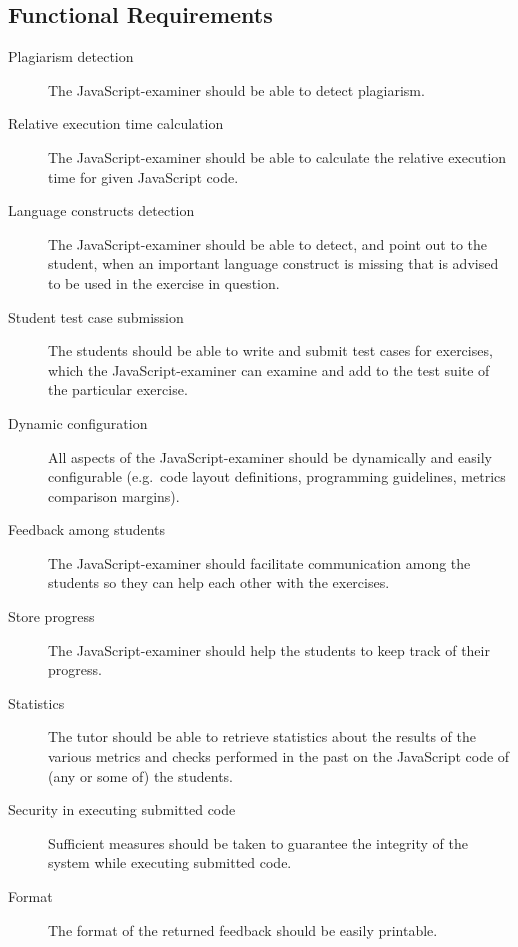 \subsection{Functional Requirements}
\begin{description}
  \item[Plagiarism detection] The JavaScript-examiner should be able to detect
    plagiarism.
  \item[Relative execution time calculation] The JavaScript-examiner should be 
    able to calculate the relative execution time for given JavaScript code.
  \item[Language constructs detection] The JavaScript-examiner should be able
    to detect, and point out to the student, when an important language
    construct is missing that is advised to be used in the exercise in
    question.
  \item[Student test case submission] The students should be able to write and
    submit test cases for exercises, which the JavaScript-examiner can examine
    and add to the test suite of the particular exercise.
  \item[Dynamic configuration] All aspects of the JavaScript-examiner should be
    dynamically and easily configurable (e.g.\ code layout definitions,
    programming guidelines, metrics comparison margins).
  \item[Feedback among students] The JavaScript-examiner should facilitate 
    communication among the students so they can help each other with the 
    exercises. 
  \item[Store progress] The JavaScript-examiner should help the students to
    keep track of their progress.
  \item[Statistics] The tutor should be able to retrieve statistics about the
    results of the various metrics and checks performed in the past on the
    JavaScript code of (any or some of) the students.
  \item[Security in executing submitted code] Sufficient measures should be
    taken to guarantee the integrity of the system while executing submitted
    code.
  \item[Format] The format of the returned feedback should be easily printable.
\end{description}

